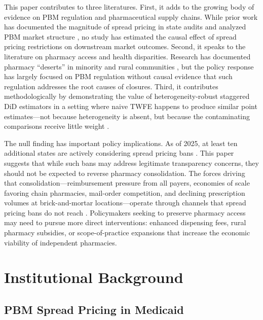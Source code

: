 \documentclass[12pt]{article}
\begin{document}
This paper contributes to three literatures. First, it adds to the growing body of evidence on PBM regulation and pharmaceutical supply chains. While prior work has documented the magnitude of spread pricing in state audits \citep{ohio2018audit, kentucky2020pbm} and analyzed PBM market structure \citep{dafny2012paying, sood2017flow, vandervelde2018pbm}, no study has estimated the causal effect of spread pricing restrictions on downstream market outcomes. Second, it speaks to the literature on pharmacy access and health disparities. Research has documented pharmacy ``deserts'' in minority and rural communities \citep{qato2014pharmacy, qato2017pharmacy, guadamuz2020closing, lookinsight2023closures}, but the policy response has largely focused on PBM regulation without causal evidence that such regulation addresses the root causes of closures. Third, it contributes methodologically by demonstrating the value of heterogeneity-robust staggered DiD estimators in a setting where naive TWFE happens to produce similar point estimates---not because heterogeneity is absent, but because the contaminating comparisons receive little weight \citep{goodman2021difference}.

The null finding has important policy implications. As of 2025, at least ten additional states are actively considering spread pricing bans \citep{ncsl2023pbm}. This paper suggests that while such bans may address legitimate transparency concerns, they should not be expected to reverse pharmacy consolidation. The forces driving that consolidation---reimbursement pressure from all payers, economies of scale favoring chain pharmacies, mail-order competition, and declining prescription volumes at brick-and-mortar locations---operate through channels that spread pricing bans do not reach \citep{schommer2020pharmacist, brown2017pharmacist, lookinsight2023closures}. Policymakers seeking to preserve pharmacy access may need to pursue more direct interventions: enhanced dispensing fees, rural pharmacy subsidies, or scope-of-practice expansions that increase the economic viability of independent pharmacies.

\section{Institutional Background}

\subsection{PBM Spread Pricing in Medicaid}
\end{document}
